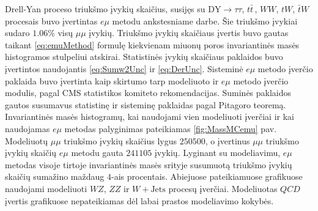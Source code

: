 \documentclass[a4paper, 12pt, oneside]{article}
\newcommand{\emu}{e\mu}
\newcommand{\DYtau}{\mathrm{DY} \! \rightarrow \! \tau\tau}
\newcommand{\QCD}{QC\! D}
\newlength\q
\begin{document}
Drell-Yan proceso triukšmo įvykių skaičius, susijęs su $\DYtau$, $t\bar{t}\,$, $WW$, $tW$, $\bar{t}W$ procesais buvo įvertintas
$\emu$ metodu ankstesniame darbe.
Šie triukšmo įvykiai sudaro $1.06\%$ visų $\mu\mu$ įvykių.
Triukšmo įvykių skaičiaus įvertis buvo gautas taikant \eqref{eq:emuMethod} formulę kiekvienam miuonų poros invariantinės masės
histogramos stulpeliui atskirai.
Statistinės įvykių skaičiaus paklaidos buvo įvertintos naudojantis \eqref{eq:Sumw2Unc} ir \eqref{eq:DerUnc}.
Sisteminė $\emu$ metodo įverčio paklaida buvo įvertinta kaip skirtumo tarp modeliuoto ir $\emu$ metodo įverčio modulis, pagal
CMS statistikos komiteto rekomendacijas.
Suminės paklaidos gautos susumavus statistinę ir sisteminę paklaidas pagal Pitagoro teoremą.
Invariantinės masės histogramų, kai naudojami vien modeliuoti įverčiai ir kai naudojamas $\emu$ metodas palyginimas pateikiamas
\ref{fig:MassMCemu} pav.
Modeliuotų $\mu\mu$ triukšmo įvykių skaičius lygus $250500$, o įvertinus $\mu\mu$ triukšmo įvykių skaičių  $e\mu$ metodu
gauta $241105$ įvykių.
Lyginant su modeliavimu, $\emu$ metodas visoje tirtoje invariantinės masės srityje susumuotą triukšmo įvykių skaičių
sumažino maždaug $4$-ais procentais.
Abiejuose pateikiamuose grafikuose naudojami modeliuoti $WZ$, $ZZ$ ir $W+\mathrm{Jets}$ procesų įverčiai.
Modeliuotas $\QCD$ įvertis grafikuose nepateikiamas dėl labai prastos modeliavimo kokybės.
\end{document}
